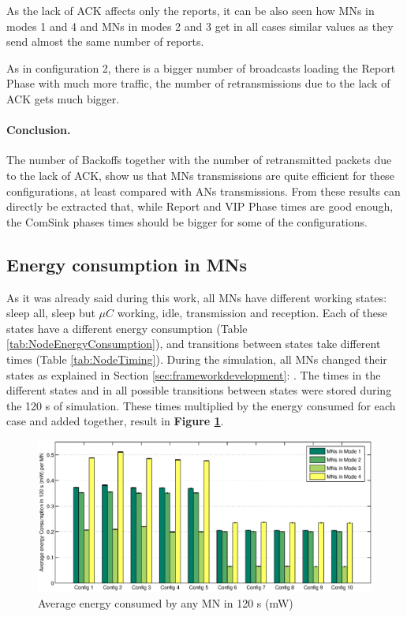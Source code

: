 As the lack of \ac{ACK} affects only the reports, it can be also seen how \acp{MN} in modes 1 and 4 and \acp{MN} in modes 2 and 3 get in all cases similar
values as they send almost the same number of reports.

As in configuration 2, there is a bigger number of broadcasts loading the Report Phase with much more traffic, the number of retransmissions due to 
the lack of \ac{ACK} gets much bigger.

\paragraph{Conclusion.} The number of Backoffs together with the number of retransmitted packets due to the lack of ACK, show us that \acp{MN} transmissions 
are quite efficient for these configurations, at least compared with \acp{AN} transmissions. From these results can directly be extracted that, while 
Report and VIP Phase times are good enough, the ComSink phases times should be bigger for some of the configurations.

\subsection{Energy consumption in \acp{MN}}

As it was already said during this work, all \acp{MN} have different working states: sleep all, sleep but $\mu C$ working, idle, transmission and 
reception. Each of these states have a different energy consumption (Table \ref{tab:NodeEnergyConsumption}), and transitions between states take 
different times (Table \ref{tab:NodeTiming}). During the simulation, all \acp{MN} changed their states as explained in Section 
\ref{sec:frameworkdevelopment}: . The times in the different states and in all possible transitions between states were stored
during the 120 s of simulation. These times multiplied by the energy consumed for each case and added together, result in \textbf{Figure \ref{fig:energyConsumptionPerMN}}.

\begin{figure}[ht]
 \begin{center}
  \includegraphics[width=1\textwidth]{energyConsumptionPerMN.eps}
 \end{center}
 \caption{Average energy consumed by any \ac{MN} in 120 s (mW)}
 \label{fig:energyConsumptionPerMN}
\end{figure}

